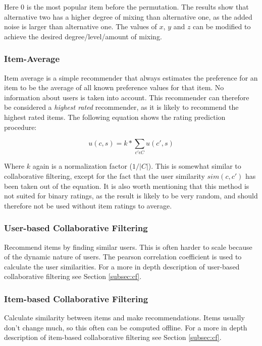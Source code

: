 Here 0 is the most popular item before the permutation. The results show that alternative two has a higher degree of mixing than alternative one, as the added noise is larger than alternative one. The values of $x$, $y$ and $z$ can be modified to achieve the desired degree/level/amount of mixing.

\subsubsection{Item-Average}

Item average is a simple recommender that always estimates the preference for an item to be the average of all known preference values for that item. No information about users is taken into account. This recommender can therefore be considered a \emph{highest rated} recommender, as it is likely to recommend the highest rated items. The following equation shows the rating prediction procedure:

\begin{equation}
\label{equation:itemaverageratingprediction}
u(c,s) = k * \sum_{c' \epsilon C} u(c',s)
\end{equation}

Where $k$ again is a normalization factor ($1/|C|$). This is somewhat similar to collaborative filtering, except for the fact that the user similarity $sim(c, c')$ has been taken out of the equation. It is also worth mentioning that this method is not suited for binary ratings, as the result is likely to be very random, and should therefore not be used without item ratings to average.

\subsubsection{User-based Collaborative Filtering}

Recommend items by finding similar users. This is often harder to scale because of the dynamic nature of users. The pearson correlation coefficient is used to calculate the user similarities. For a more in depth description of user-based collaborative filtering see Section \ref{subsec:cf}.

\subsubsection{Item-based Collaborative Filtering}

Calculate similarity between items and make recommendations. Items usually don't change much, so this often can be computed offline. For a more in depth description of item-based collaborative filtering see Section \ref{subsec:cf}.%

